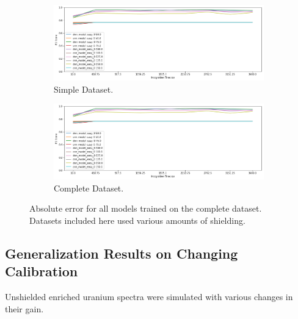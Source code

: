 \begin{figure}[H]
     \centering
     \begin{subfigure}[b]{0.9\textwidth}
         \centering
         \includegraphics[width=\textwidth]{images/results_easy_distance_comparison}
         \caption{Simple Dataset.}
         \label{fig:results_full_background_inject_simple}
     \end{subfigure}

     \begin{subfigure}[b]{0.9\textwidth}
         \centering
         \includegraphics[width=\textwidth]{images/results_easy_distance_comparison}
         \caption{Complete Dataset.}
         \label{fig:results_full_background_inject_full}
     \end{subfigure}
        \caption{Absolute error for all models trained on the complete dataset. Datasets included here used various amounts of shielding.}
        \label{fig:results_full_background_inject}
\end{figure}



\subsection{Generalization Results on Changing Calibration}

Unshielded enriched uranium spectra were simulated with various changes in their gain.  


